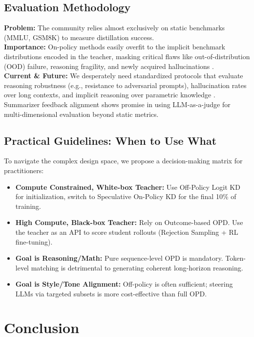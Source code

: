 \documentclass{article}
\begin{document}
\subsection{Evaluation Methodology}
\textbf{Problem:} The community relies almost exclusively on static benchmarks (MMLU, GSM8K) to measure distillation success. \\
\textbf{Importance:} On-policy methods easily overfit to the implicit benchmark distributions encoded in the teacher, masking critical flaws like out-of-distribution (OOD) failure, reasoning fragility, and newly acquired hallucinations \citep{arxiv_2405_05904}. \\
\textbf{Current \& Future:} We desperately need standardized protocols that evaluate reasoning robustness (e.g., resistance to adversarial prompts), hallucination rates over long contexts, and implicit reasoning over parametric knowledge \citep{arxiv_2405_15071}. Summarizer feedback alignment \citep{arxiv_2410_13116} shows promise in using LLM-as-a-judge for multi-dimensional evaluation beyond static metrics.

\subsection{Practical Guidelines: When to Use What}
To navigate the complex design space, we propose a decision-making matrix for practitioners:
\begin{itemize}
    \item \textbf{Compute Constrained, White-box Teacher:} Use Off-Policy Logit KD for initialization, switch to Speculative On-Policy KD for the final 10\% of training.
    \item \textbf{High Compute, Black-box Teacher:} Rely on Outcome-based OPD. Use the teacher as an API to score student rollouts (Rejection Sampling + RL fine-tuning).
    \item \textbf{Goal is Reasoning/Math:} Pure sequence-level OPD is mandatory. Token-level matching is detrimental to generating coherent long-horizon reasoning.
    \item \textbf{Goal is Style/Tone Alignment:} Off-policy is often sufficient; steering LLMs via targeted subsets \citep{arxiv_2406_00888} is more cost-effective than full OPD.
\end{itemize}

\section{Conclusion}
\label{sec:conclusion}
\end{document}
